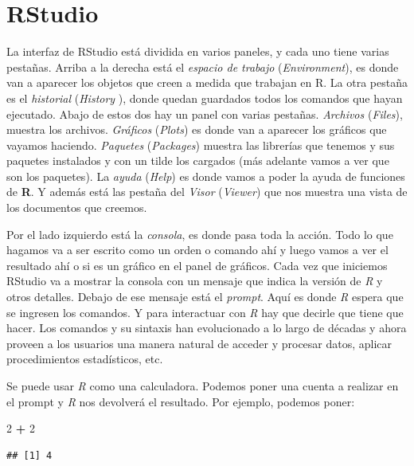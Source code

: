 \documentclass[]{book}
\newenvironment{Shaded}{\begin{snugshade}}{\end{snugshade}}
\newcommand{\DecValTok}[1]{\textcolor[rgb]{0.00,0.00,0.81}{#1}}
\newcommand{\OperatorTok}[1]{\textcolor[rgb]{0.81,0.36,0.00}{\textbf{#1}}}
\newcommand{\StringTok}[1]{\textcolor[rgb]{0.31,0.60,0.02}{#1}}
\theoremstyle{definition}
\theoremstyle{definition}
\theoremstyle{definition}
\theoremstyle{remark}
\begin{document}
\hypertarget{rstudio}{%
\section{RStudio}\label{rstudio}}

La interfaz de RStudio está dividida en varios paneles, y cada uno tiene
varias pestañas. Arriba a la derecha está el \emph{espacio de trabajo}
(\emph{Environment}), es donde van a aparecer los objetos que creen a
medida que trabajan en R. La otra pestaña es el \emph{historial}
(\emph{History} ), donde quedan guardados todos los comandos que hayan
ejecutado. Abajo de estos dos hay un panel con varias pestañas.
\emph{Archivos} (\emph{Files}), muestra los archivos. \emph{Gráficos}
(\emph{Plots}) es donde van a aparecer los gráficos que vayamos
haciendo. \emph{Paquetes} (\emph{Packages}) muestra las librerías que
tenemos y sus paquetes instalados y con un tilde los cargados (más
adelante vamos a ver que son los paquetes). La \emph{ayuda}
(\emph{Help}) es donde vamos a poder la ayuda de funciones de
\textbf{R}. Y además está las pestaña del \emph{Visor} (\emph{Viewer})
que nos muestra una vista de los documentos que creemos.

Por el lado izquierdo está la \emph{consola}, es donde pasa toda la
acción. Todo lo que hagamos va a ser escrito como un orden o comando ahí
y luego vamos a ver el resultado ahí o si es un gráfico en el panel de
gráficos. Cada vez que iniciemos RStudio va a mostrar la consola con un
mensaje que indica la versión de \emph{R} y otros detalles. Debajo de
ese mensaje está el \emph{prompt}. Aquí es donde \emph{R} espera que se
ingresen los comandos. Y para interactuar con \emph{R} hay que decirle
que tiene que hacer. Los comandos y su sintaxis han evolucionado a lo
largo de décadas y ahora proveen a los usuarios una manera natural de
acceder y procesar datos, aplicar procedimientos estadísticos, etc.

Se puede usar \emph{R} como una calculadora. Podemos poner una cuenta a
realizar en el prompt y \emph{R} nos devolverá el resultado. Por
ejemplo, podemos poner:

\begin{Shaded}
\begin{Highlighting}[]
\DecValTok{2} \OperatorTok{+}\StringTok{ }\DecValTok{2}
\end{Highlighting}
\end{Shaded}

\begin{verbatim}
## [1] 4
\end{verbatim}
\end{document}
